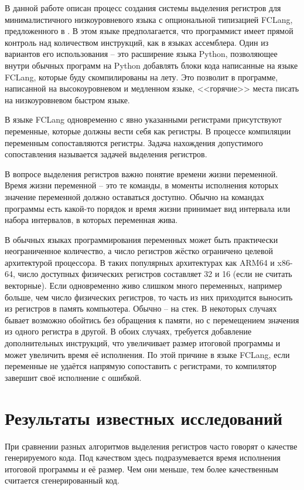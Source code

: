 \documentclass[a4paper,14pt]{extarticle}
\begin{document}
В данной работе описан процесс создания системы выделения регистров для
минималистичного низкоуровневого языка с опциональной типизацией FCLang, предложенного в \cite{____2023}.
В этом языке предполагается, что программист имеет прямой контроль над количеством инструкций, как в языках ассемблера.
Один из вариантов его использования -- это расширение языка Python, позволяющее внутри обычных программ на Python 
добавлять блоки кода написанные на языке FCLang, которые буду скомпилированы на лету. 
Это позволит в программе, написанной на высокоуровневом и медленном языке, <<горячие>> места писать на низкоуровневом быстром языке.

В языке FCLang одновременно с явно указанными регистрами присутствуют переменные, которые должны вести себя как регистры.
В процессе компиляции переменным сопоставляются регистры.
Задача нахождения допустимого сопоставления называется задачей выделения регистров.

В вопросе выделения регистров важно понятие времени жизни переменной.
Время жизни переменной -- это те команды, в моменты исполнения которых значение переменной должно оставаться доступно.
Обычно на командах программы есть какой-то порядок и время жизни принимает вид интервала или набора интервалов, в которых переменная жива.

В обычных языках программирования переменных может быть практически неограниченное количество, а число регистров жёстко ограничено целевой архитектурой процессора.
В таких популярных архитектурах как ARM64 и x86-64, число доступных физических регистров составляет 32 и 16 (если не считать векторные).
Если одновременно живо слишком много переменных, например больше, чем число физических регистров,
то часть из них приходится выносить из регистров в память компьютера.
Обычно -- на стек.
В некоторых случаях бывает возможно обойтись без обращения к памяти, но с перемещением значения из одного регистра в другой.
В обоих случаях, требуется добавление дополнительных инструкций, что увеличивает размер итоговой программы и может увеличить время её исполнения.
По этой причине в языке FCLang, если переменные не удаётся напрямую сопоставить с регистрами, то компилятор завершит своё исполнение с ошибкой.

\section{Результаты известных исследований}

При сравнении разных алгоритмов выделения регистров часто говорят о качестве генерируемого кода.
Под качеством здесь подразумевается время исполнения итоговой программы и её размер.
Чем они меньше, тем более качественным считается сгенерированный код.
\end{document}

